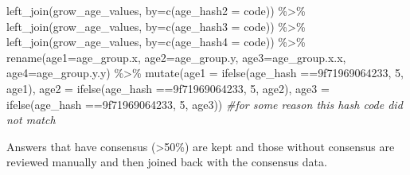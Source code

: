 \documentclass[
]{article}
\newenvironment{Shaded}{\begin{snugshade}}{\end{snugshade}}
\newcommand{\AttributeTok}[1]{\textcolor[rgb]{0.77,0.63,0.00}{#1}}
\newcommand{\CommentTok}[1]{\textcolor[rgb]{0.56,0.35,0.01}{\textit{#1}}}
\newcommand{\DecValTok}[1]{\textcolor[rgb]{0.00,0.00,0.81}{#1}}
\newcommand{\FunctionTok}[1]{\textcolor[rgb]{0.00,0.00,0.00}{#1}}
\newcommand{\NormalTok}[1]{#1}
\newcommand{\OtherTok}[1]{\textcolor[rgb]{0.56,0.35,0.01}{#1}}
\newcommand{\SpecialCharTok}[1]{\textcolor[rgb]{0.00,0.00,0.00}{#1}}
\newcommand{\StringTok}[1]{\textcolor[rgb]{0.31,0.60,0.02}{#1}}
\begin{document}
\begin{Shaded}
\begin{Highlighting}[]
  \FunctionTok{left\_join}\NormalTok{(grow\_age\_values, }\AttributeTok{by=}\FunctionTok{c}\NormalTok{(}\StringTok{\textquotesingle{}age\_hash2\textquotesingle{}} \OtherTok{=} \StringTok{\textquotesingle{}code\textquotesingle{}}\NormalTok{))  }\SpecialCharTok{\%\textgreater{}\%} 
  \FunctionTok{left\_join}\NormalTok{(grow\_age\_values, }\AttributeTok{by=}\FunctionTok{c}\NormalTok{(}\StringTok{\textquotesingle{}age\_hash3\textquotesingle{}} \OtherTok{=} \StringTok{\textquotesingle{}code\textquotesingle{}}\NormalTok{)) }\SpecialCharTok{\%\textgreater{}\%} 
  \FunctionTok{left\_join}\NormalTok{(grow\_age\_values, }\AttributeTok{by=}\FunctionTok{c}\NormalTok{(}\StringTok{\textquotesingle{}age\_hash4\textquotesingle{}} \OtherTok{=} \StringTok{\textquotesingle{}code\textquotesingle{}}\NormalTok{)) }\SpecialCharTok{\%\textgreater{}\%} 
  \FunctionTok{rename}\NormalTok{(}\AttributeTok{age1=}\NormalTok{age\_group.x, }\AttributeTok{age2=}\NormalTok{age\_group.y, }\AttributeTok{age3=}\NormalTok{age\_group.x.x, }\AttributeTok{age4=}\NormalTok{age\_group.y.y) }\SpecialCharTok{\%\textgreater{}\%} 
  \FunctionTok{mutate}\NormalTok{(}\AttributeTok{age1 =} \FunctionTok{ifelse}\NormalTok{(age\_hash }\SpecialCharTok{==}\StringTok{\textquotesingle{}9f71969064233\textquotesingle{}}\NormalTok{, }\DecValTok{5}\NormalTok{, age1), }
         \AttributeTok{age2 =} \FunctionTok{ifelse}\NormalTok{(age\_hash }\SpecialCharTok{==}\StringTok{\textquotesingle{}9f71969064233\textquotesingle{}}\NormalTok{, }\DecValTok{5}\NormalTok{, age2),}
         \AttributeTok{age3 =} \FunctionTok{ifelse}\NormalTok{(age\_hash }\SpecialCharTok{==}\StringTok{\textquotesingle{}9f71969064233\textquotesingle{}}\NormalTok{, }\DecValTok{5}\NormalTok{, age3)) }\CommentTok{\#for some reason this hash code did not match}
\end{Highlighting}
\end{Shaded}

Answers that have consensus (\textgreater50\%) are kept and those
without consensus are reviewed manually and then joined back with the
consensus data.
\end{document}
